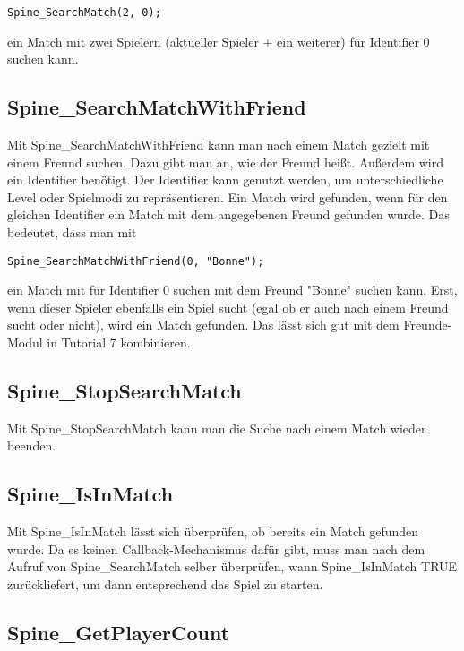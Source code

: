 \documentclass{article}
\begin{document}
\begin{lstlisting}
Spine_SearchMatch(2, 0);
\end{lstlisting}

ein Match mit zwei Spielern (aktueller Spieler + ein weiterer) für Identifier 0 suchen kann.

\subsection{Spine\_SearchMatchWithFriend}

Mit Spine\_SearchMatchWithFriend kann man nach einem Match gezielt mit einem Freund suchen. Dazu gibt man an, wie der Freund heißt. Außerdem wird ein Identifier benötigt. Der Identifier kann genutzt werden, um unterschiedliche Level oder Spielmodi zu repräsentieren. Ein Match wird gefunden, wenn für den gleichen Identifier ein Match mit dem angegebenen Freund gefunden wurde.  Das bedeutet, dass man mit

\begin{lstlisting}
Spine_SearchMatchWithFriend(0, "Bonne");
\end{lstlisting}

ein Match mit für Identifier 0 suchen mit dem Freund "Bonne" suchen kann. Erst, wenn dieser Spieler ebenfalls ein Spiel sucht (egal ob er auch nach einem Freund sucht oder nicht), wird ein Match gefunden. Das lässt sich gut mit dem Freunde-Modul in Tutorial 7 kombinieren.

\subsection{Spine\_StopSearchMatch}

Mit Spine\_StopSearchMatch kann man die Suche nach einem Match wieder beenden.

\subsection{Spine\_IsInMatch}

Mit Spine\_IsInMatch lässt sich überprüfen, ob bereits ein Match gefunden wurde. Da es keinen Callback-Mechanismus dafür gibt, muss man nach dem Aufruf von Spine\_SearchMatch selber überprüfen, wann Spine\_IsInMatch TRUE zurückliefert, um dann entsprechend das Spiel zu starten.

\subsection{Spine\_GetPlayerCount}
\end{document}
